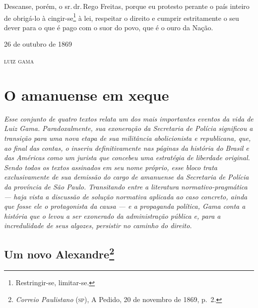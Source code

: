 Descanse, porém, o sr.\,dr.\,Rego Freitas, porque eu protesto perante o
país inteiro de obrigá-lo à cingir-se\footnote{Restringir-se,
  limitar-se.} à lei, respeitar o direito e cumprir estritamente o seu
dever para o que é pago com o suor do povo, que é o ouro da Nação.

\begin{flushright}
26 de outubro de 1869

\textsc{luiz gama}
\end{flushright}

\part{O amanuense em xeque} %

\begin{argumento}\itshape
Esse conjunto de quatro textos relata um dos mais importantes eventos da
vida de Luiz Gama. Paradoxalmente, sua exoneração da Secretaria de
Polícia significou a transição para uma nova etapa de sua militância
abolicionista e republicana, que, ao final das contas, o inseriu
definitivamente nas páginas da história do Brasil e das Américas como um
jurista que concebeu uma estratégia de liberdade original. Sendo todos
os textos assinados em seu nome próprio, esse bloco trata exclusivamente
de sua demissão do cargo de amanuense da Secretaria de Polícia da
província de São Paulo. Transitando entre a literatura
normativo-pragmática --- haja vista a discussão de solução normativa
aplicada ao caso concreto, ainda que fosse ele o protagonista da causa
--- e a propaganda política, Gama conta a história que o levou a ser
exonerado da administração pública e, para a incredulidade de seus
algozes, persistir no caminho do direito.
\end{argumento}

\chapter{Um novo Alexandre\footnote{\emph{Correio Paulistano} (\textsc{sp}), A
  Pedido, 20 de novembro de 1869, p.~2.}}

